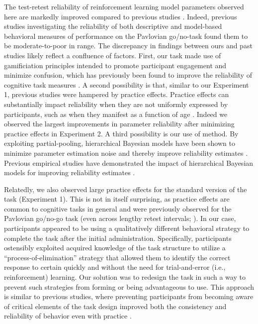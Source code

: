 \documentclass[a4paper,12pt]{article}
\begin{document}
\begin{refsection}[main]
The test-retest reliability of reinforcement learning model parameters observed here are markedly improved compared to previous studies \cite{moutoussis2018change, pike2022test}. Indeed, previous studies investigating the reliability of both descriptive and model-based behavioral measures of performance on the Pavlovian go/no-task found them to be moderate-to-poor in range. The discrepancy in findings between ours and past studies likely reflect a confluence of factors. First, our task made use of gamificiation principles intended to promote participant engagement and minimize confusion, which has previously been found to improve the reliability of cognitive task measures \cite{kucina2022solution, verdejo2021unified}. A second possibility is that, similar to our Experiment 1, previous studies were hampered by practice effects. Practice effects can substantially impact reliability when they are not uniformly expressed by participants, such as when they manifest as a function of age \cite{anokhin2022age}. Indeed we observed the largest improvements in parameter reliability after minimizing practice effects in Experiment 2. A third possibility is our use of method. By exploiting partial-pooling, hierarchical Bayesian models have been shown to minimize parameter estimation noise and thereby improve reliability estimates \cite{haines2023classical, rouder2019psychometrics}. Previous empirical studies have demonstrated the impact of hierarchical Bayesian models for improving reliability estimates \cite{brown2020improving, waltmann2022sufficient}. 

Relatedly, we also observed large practice effects for the standard version of the task (Experiment 1). This is not in itself surprising, as practice effects are common to cognitive tasks in general \cite{hausknecht2007retesting, scharfen2018retest} and were previously observed for the Pavlovian go/no-go task (even across lengthy retest intervals; \cite{moutoussis2018change}). In our case, participants appeared to be using a qualitatively different behavioral strategy to complete the task after the initial administration. Specifically, participants ostensibly exploited acquired knowledge of the task structure to utilize a ``process-of-elimination'' strategy that allowed them to identify the correct response to certain quickly and without the need for trial-and-error (i.e., reinforcement) learning. Our solution was to redesign the task in such a way to prevent such strategies from forming or being advantageous to use. This approach is similar to previous studies, where preventing participants from becoming aware of critical elements of the task design improved both the consistency and reliability of behavior even with practice \cite{mclean2018towards}. 


\end{refsection}
\end{document}
